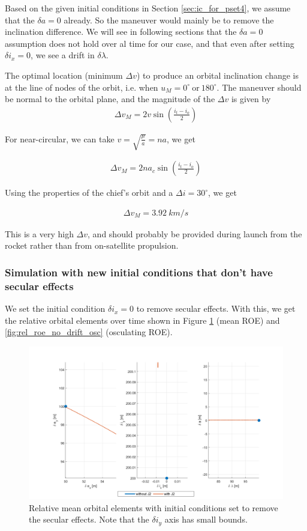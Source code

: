 Based on the given initial conditions in Section \ref{sec:ic_for_pset4}, we assume that the $\delta a = 0$ already. So the maneuver would mainly be to remove the inclination difference. We will see in following sections that the $\delta a = 0$ assumption does not hold over al time for our case, and that even after setting $\delta i_x = 0$, we see a drift in $\delta \lambda$.

The optimal location (minimum $\Delta v$) to produce an orbital inclination change is at the line of nodes of the orbit, i.e. when $u_M = 0^\circ \ \text{or} \ 180^\circ$. The maneuver should be normal to the orbital plane, and the magnitude of the $\Delta v$ is given by
\begin{align}
    \Delta v_M = 2v\sin\left(\frac{i_t - i_o}{2}\right)
\end{align}

For near-circular, we can take $v = \sqrt{\frac{\mu}{a}} = na$, we get

\begin{align}
    \Delta v_M = 2na_c\sin\left(\frac{i_t - i_o}{2}\right)
\end{align}

Using the properties of the chief's orbit and a $\Delta i = 30^\circ$, we get

\begin{align}
    \Delta v_M = 3.92 \ km/s
\end{align}

This is a very high $\Delta v$, and should probably be provided during launch from the rocket rather than from on-satellite propulsion.

\subsubsection{Simulation with new initial conditions that don't have secular effects}

We set the initial condition $\delta i_x = 0$ to remove secular effects. With this, we get the relative orbital elements over time shown in Figure \ref{fig:rel_roe_no_drift_mean} (mean ROE) and \ref{fig:rel_roe_no_drift_osc} (osculating ROE).

\begin{figure}[H]
    \centering
    \includegraphics[width=0.8\linewidth]{sim/figures/PS4/ROE_projections_mean_no_drift_SV2.png}
    \caption{Relative mean orbital elements with initial conditions set to remove the secular effects. Note that the $\delta i_y$ axis has small bounds.}
    \label{fig:rel_roe_no_drift_mean}
\end{figure}

